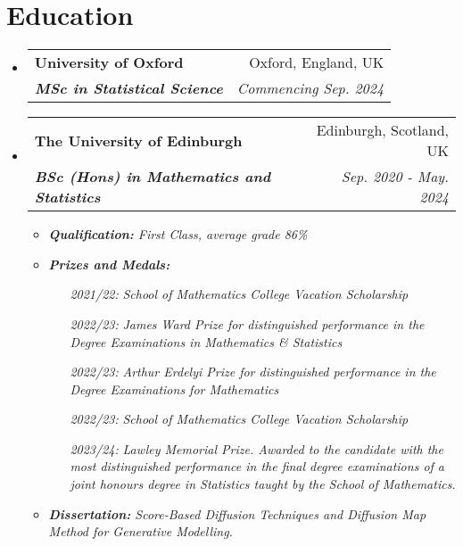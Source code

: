 \documentclass[12pt, a4paper]{article}
\makeatletter
\newcommand{\resumeSection}[1]{
    \section*{#1}
}
\newcommand{\resumeSectionItm}[4]{
\item
    \begin{tabular*}{0.96\textwidth}{@{}l@{\extracolsep{\fill}}r@{}}
        \textbf{#1} & #2 \\
        \textit{\textbf{#3}} & \textit{#4}
    \end{tabular*}
}
\makeatother
\begin{document}
\resumeSection{Education}
\begin{itemize}[leftmargin=*]
    \resumeSectionItm
	{University of Oxford}{Oxford, England, UK}
    {MSc in Statistical Science}{Commencing Sep. 2024}
\end{itemize}
\begin{itemize}[leftmargin=*]
    \resumeSectionItm
    {The University of Edinburgh}{Edinburgh, Scotland, UK}
    {BSc (Hons) in Mathematics and Statistics}{Sep. 2020 - May. 2024}
    \begin{itemize}[leftmargin=*]
        \vspace{-1mm}
        \item \it{\textbf{Qualification:} First Class, average grade 86\%}
        \item \it{\textbf{Prizes and Medals:}}
            \begin{itemize}[
                align=left,
                leftmargin=4em,
                itemindent=0.5pt,
                labelsep=0pt,
                labelwidth=4em
                ]
                \item [\it{2021/22:}]
                    \it{School of Mathematics College Vacation Scholarship}
                \item [\it{2022/23:}]
                    \it{James Ward Prize for distinguished performance in the
                        Degree Examinations in Mathematics \& Statistics}
                \item [\it{2022/23:}]
                    \it{Arthur Erdelyi Prize for distinguished
                    performance in the Degree Examinations for Mathematics}
                \item [\it{2022/23:}]
                    \it{School of Mathematics College Vacation Scholarship}
                \item [\it{2023/24:}]
                    \it{Lawley Memorial Prize. Awarded to the candidate with the most distinguished performance in the final degree examinations of a joint honours degree in Statistics taught by the School of Mathematics.}
            \end{itemize}
        \item \it{\textbf{Dissertation:} Score-Based Diffusion Techniques and Diffusion Map Method for Generative Modelling.}
    \end{itemize}
\end{itemize}
\vspace{-5.5mm}
\end{document}
